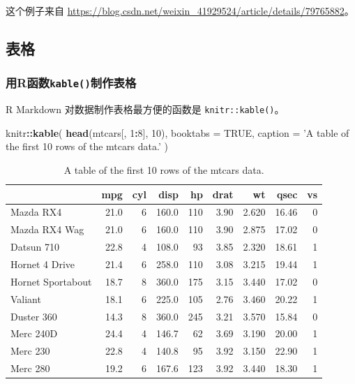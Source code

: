 \documentclass[]{article}
\newenvironment{Shaded}{\begin{snugshade}}{\end{snugshade}}
\newcommand{\DataTypeTok}[1]{\textcolor[rgb]{0.13,0.29,0.53}{#1}}
\newcommand{\DecValTok}[1]{\textcolor[rgb]{0.00,0.00,0.81}{#1}}
\newcommand{\KeywordTok}[1]{\textcolor[rgb]{0.13,0.29,0.53}{\textbf{#1}}}
\newcommand{\NormalTok}[1]{#1}
\newcommand{\OperatorTok}[1]{\textcolor[rgb]{0.81,0.36,0.00}{\textbf{#1}}}
\newcommand{\OtherTok}[1]{\textcolor[rgb]{0.56,0.35,0.01}{#1}}
\newcommand{\StringTok}[1]{\textcolor[rgb]{0.31,0.60,0.02}{#1}}
\begin{document}
这个例子来自
\url{https://blog.csdn.net/weixin_41929524/article/details/79765882}。

\subsection{表格}

\hypertarget{rkable}{%
\subsubsection{\texorpdfstring{用R函数\texttt{kable()}制作表格}{用R函数kable()制作表格}}\label{rkable}}

R Markdown 对数据制作表格最方便的函数是 \texttt{knitr::kable()}。

\begin{Shaded}
\begin{Highlighting}[]
\NormalTok{knitr}\OperatorTok{::}\KeywordTok{kable}\NormalTok{(}
  \KeywordTok{head}\NormalTok{(mtcars[, }\DecValTok{1}\OperatorTok{:}\DecValTok{8}\NormalTok{], }\DecValTok{10}\NormalTok{), }\DataTypeTok{booktabs =} \OtherTok{TRUE}\NormalTok{,}
  \DataTypeTok{caption =} \StringTok{'A table of the first 10 rows of the mtcars data.'}
\NormalTok{)}
\end{Highlighting}
\end{Shaded}

\begin{table}

\caption{\label{tab:table-single}A table of the first 10 rows of the mtcars data.}
\centering
\begin{tabular}[t]{lrrrrrrrr}
\toprule
  & mpg & cyl & disp & hp & drat & wt & qsec & vs\\
\midrule
Mazda RX4 & 21.0 & 6 & 160.0 & 110 & 3.90 & 2.620 & 16.46 & 0\\
Mazda RX4 Wag & 21.0 & 6 & 160.0 & 110 & 3.90 & 2.875 & 17.02 & 0\\
Datsun 710 & 22.8 & 4 & 108.0 & 93 & 3.85 & 2.320 & 18.61 & 1\\
Hornet 4 Drive & 21.4 & 6 & 258.0 & 110 & 3.08 & 3.215 & 19.44 & 1\\
Hornet Sportabout & 18.7 & 8 & 360.0 & 175 & 3.15 & 3.440 & 17.02 & 0\\
\addlinespace
Valiant & 18.1 & 6 & 225.0 & 105 & 2.76 & 3.460 & 20.22 & 1\\
Duster 360 & 14.3 & 8 & 360.0 & 245 & 3.21 & 3.570 & 15.84 & 0\\
Merc 240D & 24.4 & 4 & 146.7 & 62 & 3.69 & 3.190 & 20.00 & 1\\
Merc 230 & 22.8 & 4 & 140.8 & 95 & 3.92 & 3.150 & 22.90 & 1\\
Merc 280 & 19.2 & 6 & 167.6 & 123 & 3.92 & 3.440 & 18.30 & 1\\
\bottomrule
\end{tabular}
\end{table}
\end{document}
